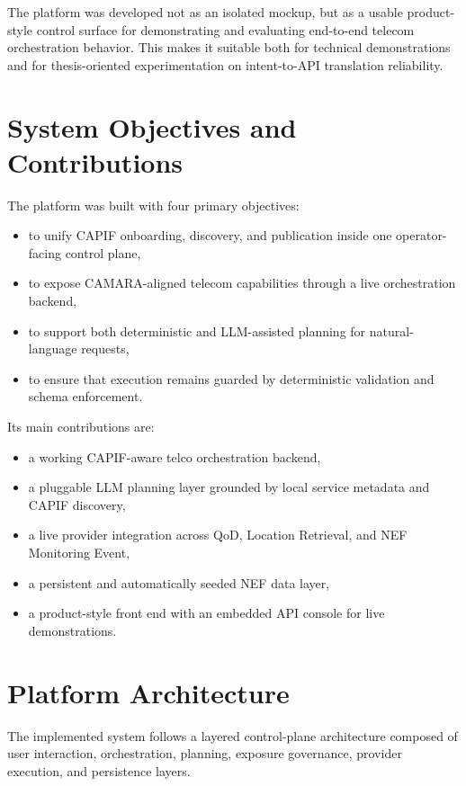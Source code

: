 \documentclass[conference]{IEEEtran}
\begin{document}
The platform was developed not as an isolated mockup, but as a usable product-style control surface for demonstrating and evaluating end-to-end telecom orchestration behavior. This makes it suitable both for technical demonstrations and for thesis-oriented experimentation on intent-to-API translation reliability.

\section{System Objectives and Contributions}

The platform was built with four primary objectives:

\begin{itemize}[leftmargin=1.1em]
\item to unify CAPIF onboarding, discovery, and publication inside one operator-facing control plane,
\item to expose CAMARA-aligned telecom capabilities through a live orchestration backend,
\item to support both deterministic and LLM-assisted planning for natural-language requests,
\item to ensure that execution remains guarded by deterministic validation and schema enforcement.
\end{itemize}

Its main contributions are:

\begin{itemize}[leftmargin=1.1em]
\item a working CAPIF-aware telco orchestration backend,
\item a pluggable LLM planning layer grounded by local service metadata and CAPIF discovery,
\item a live provider integration across QoD, Location Retrieval, and NEF Monitoring Event,
\item a persistent and automatically seeded NEF data layer,
\item a product-style front end with an embedded API console for live demonstrations.
\end{itemize}

\section{Platform Architecture}

The implemented system follows a layered control-plane architecture composed of user interaction, orchestration, planning, exposure governance, provider execution, and persistence layers.
\end{document}
